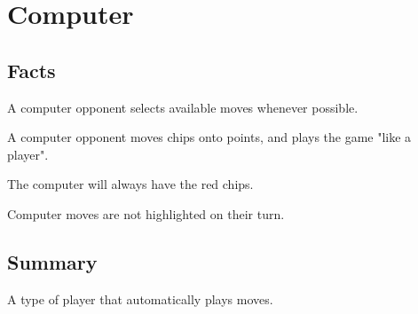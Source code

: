 \section{Computer}

\subsection{Facts}

\begin{dashed}
    \item A computer opponent selects available moves whenever possible.
    \item A computer opponent moves chips onto points, and plays
    the game "like a player".
    \item The computer will always have the red chips.
    \item Computer moves are not highlighted on their turn.
\end{dashed}


\subsection{Summary}
A type of player that automatically plays moves.


